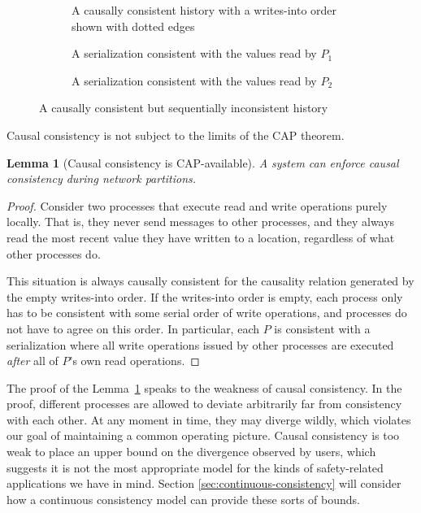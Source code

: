\documentclass[]             %
{NASA}                       %
\newtheorem{lemma}[theorem]{Lemma}
\theoremstyle{definition}
\begin{document}
\begin{figure}
  \setlength\belowcaptionskip{5ex}
  \begin{subfigure}{1\textwidth}
    \centering
    
    \caption{A causally consistent history with a writes-into order
      shown with dotted edges}
    \label{fig:dsm-causal-ex1}
  \end{subfigure}
  \begin{subfigure}{1\textwidth}
    \centering
    
    \caption{A serialization consistent with the values read by $P_1$}
    \label{fig:dsm-causal-ex1-serial1}
  \end{subfigure}
  \begin{subfigure}{1\textwidth}
    \centering
    
    \caption{A serialization consistent with the values read by $P_2$}
    \label{fig:dsm-causal-ex1-serial2}
  \end{subfigure}
  \caption{A causally consistent but sequentially inconsistent history}
\end{figure}

Causal consistency is not subject to the limits of the CAP theorem.

\begin{lemma}[Causal consistency is CAP-available]
  \label{thm:cap-causal}
  A system can enforce causal consistency during network partitions.
\end{lemma}
\begin{proof}
  Consider two processes that execute read and write operations purely
  locally. That is, they never send messages to other processes, and
  they always read the most recent value they have written to a
  location, regardless of what other processes do.

  This situation is always causally consistent for the causality
  relation generated by the empty writes-into order. If the
  writes-into order is empty, each process only has to be consistent
  with some serial order of write operations, and processes do not
  have to agree on this order. In particular, each $P$ is
  consistent with a serialization where all write operations issued by
  other processes are executed \emph{after} all of $P$'s own read
  operations.
\end{proof}

The proof of the Lemma~\ref{thm:cap-causal} speaks to the weakness of
causal consistency. In the proof, different processes are allowed to
deviate arbitrarily far from consistency with each other. At any
moment in time, they may diverge wildly, which violates our goal of
maintaining a common operating picture. Causal consistency is too weak
to place an upper bound on the divergence observed by users, which
suggests it is not the most appropriate model for the kinds of
safety-related applications we have in mind. Section
\ref{sec:continuous-consistency} will consider how a continuous
consistency model can provide these sorts of bounds.
\end{document}
